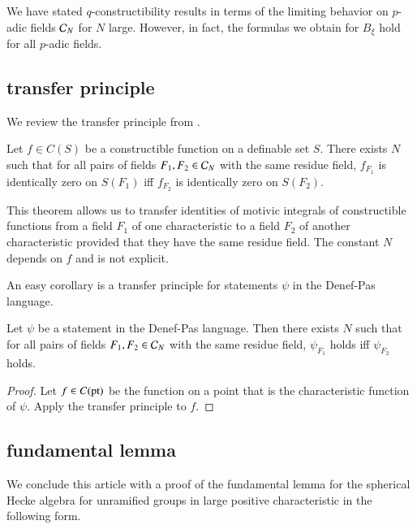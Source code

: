 \begin{remark}  
  We have stated $q$-constructibility results in terms of the limiting
  behavior on $p$-adic fields $\mathcal C_N$ for $N$ large.  However, in fact,
  the formulas we obtain for $B_\xi$ hold for all $p$-adic fields.
\end{remark}


\subsection{transfer principle}\label{sec:transfer}

We review the transfer principle from
\cite{cluckers2010constructible}.

\begin{theorem}\label{thm:transfer-principle}
  Let $f\in C(S)$ be a constructible function on a definable set $S$.
  There exists $N$ such that for all pairs of fields $F_1,F_2\in \mathcal C_N$
  with the same residue field, $f_{F_1}$ is identically zero on
  $S(F_1)$ iff $f_{F_2}$ is identically zero on $S(F_2)$.
\end{theorem}

This theorem allows us to transfer identities of motivic integrals of
constructible functions from a field $F_1$ of one characteristic to a
field $F_2$ of another characteristic provided that they have the same
residue field.  The constant $N$ depends on $f$ and is not explicit.

An easy corollary is a transfer principle for statements $\psi$ in the
Denef-Pas language.

\begin{corollary} Let $\psi$ be a statement in the Denef-Pas language.
  Then there exists $N$ such that for all pairs of fields $F_1,F_2\in
  \mathcal C_N$ with the same residue field, $\psi_{F_1}$ holds iff
  $\psi_{F_2}$ holds.
\end{corollary}

\begin{proof} Let $f\in C({\operatorname{pt}})$ be the function on a point that is
  the characteristic function of $\psi$.  Apply the transfer principle
  to $f$.
\end{proof}

\subsection{fundamental lemma}

We conclude this article with a proof of the fundamental lemma for the
spherical Hecke algebra for unramified groups in large positive
characteristic in the following form.

